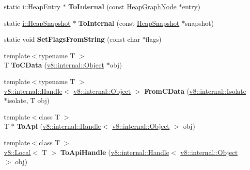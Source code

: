\begin{DoxyCompactItemize}
\item 
static i\+::\+Heap\+Entry $\ast$ {\bfseries To\+Internal} (const \hyperlink{classv8_1_1_heap_graph_node}{Heap\+Graph\+Node} $\ast$entry)\hypertarget{namespacev8_ad7fa21c8b157b649d19664d4eb665cc6}{}\label{namespacev8_ad7fa21c8b157b649d19664d4eb665cc6}

\item 
static \hyperlink{classv8_1_1internal_1_1_heap_snapshot}{i\+::\+Heap\+Snapshot} $\ast$ {\bfseries To\+Internal} (const \hyperlink{classv8_1_1_heap_snapshot}{Heap\+Snapshot} $\ast$snapshot)\hypertarget{namespacev8_af5c712ba5a2829b4ca01e1d22085df69}{}\label{namespacev8_af5c712ba5a2829b4ca01e1d22085df69}

\item 
static void {\bfseries Set\+Flags\+From\+String} (const char $\ast$flags)\hypertarget{namespacev8_a0a914f95fa6742591a670aaf6de2136b}{}\label{namespacev8_a0a914f95fa6742591a670aaf6de2136b}

\item 
{\footnotesize template$<$typename T $>$ }\\T {\bfseries To\+C\+Data} (\hyperlink{classv8_1_1internal_1_1_object}{v8\+::internal\+::\+Object} $\ast$obj)\hypertarget{namespacev8_a2ac0c934ca271579de66b77191276949}{}\label{namespacev8_a2ac0c934ca271579de66b77191276949}

\item 
{\footnotesize template$<$typename T $>$ }\\\hyperlink{classv8_1_1internal_1_1_handle}{v8\+::internal\+::\+Handle}$<$ \hyperlink{classv8_1_1internal_1_1_object}{v8\+::internal\+::\+Object} $>$ {\bfseries From\+C\+Data} (\hyperlink{classv8_1_1internal_1_1_isolate}{v8\+::internal\+::\+Isolate} $\ast$isolate, T obj)\hypertarget{namespacev8_a1216633b79851d484a96027009ab1684}{}\label{namespacev8_a1216633b79851d484a96027009ab1684}

\item 
{\footnotesize template$<$class T $>$ }\\T $\ast$ {\bfseries To\+Api} (\hyperlink{classv8_1_1internal_1_1_handle}{v8\+::internal\+::\+Handle}$<$ \hyperlink{classv8_1_1internal_1_1_object}{v8\+::internal\+::\+Object} $>$ obj)\hypertarget{namespacev8_a98d47670140d25c3837f86b08c060707}{}\label{namespacev8_a98d47670140d25c3837f86b08c060707}

\item 
{\footnotesize template$<$class T $>$ }\\\hyperlink{classv8_1_1_local}{v8\+::\+Local}$<$ T $>$ {\bfseries To\+Api\+Handle} (\hyperlink{classv8_1_1internal_1_1_handle}{v8\+::internal\+::\+Handle}$<$ \hyperlink{classv8_1_1internal_1_1_object}{v8\+::internal\+::\+Object} $>$ obj)\hypertarget{namespacev8_afe7f28d7316bb0f494b0f76055a35b3a}{}\label{namespacev8_afe7f28d7316bb0f494b0f76055a35b3a}


\end{DoxyCompactItemize}
